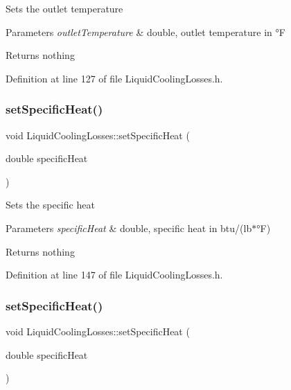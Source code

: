 Sets the outlet temperature


\begin{DoxyParams}{Parameters}
{\em outlet\+Temperature} & double, outlet temperature in °F\\
\hline
\end{DoxyParams}
\begin{DoxyReturn}{Returns}
nothing 
\end{DoxyReturn}


Definition at line 127 of file Liquid\+Cooling\+Losses.\+h.

\mbox{\label{class_liquid_cooling_losses_a38ff1ff4dc0de69c72db094bf2259993}} 
\subsubsection{\texorpdfstring{set\+Specific\+Heat()}{setSpecificHeat()}\hspace{0.1cm}{\footnotesize\ttfamily [1/3]}}
{\footnotesize\ttfamily void Liquid\+Cooling\+Losses\+::set\+Specific\+Heat (\begin{DoxyParamCaption}\item[{double}]{specific\+Heat }\end{DoxyParamCaption})\hspace{0.3cm}{\ttfamily [inline]}}

Sets the specific heat


\begin{DoxyParams}{Parameters}
{\em specific\+Heat} & double, specific heat in btu/(lb$\ast$°F)\\
\hline
\end{DoxyParams}
\begin{DoxyReturn}{Returns}
nothing 
\end{DoxyReturn}


Definition at line 147 of file Liquid\+Cooling\+Losses.\+h.

\mbox{\label{class_liquid_cooling_losses_a38ff1ff4dc0de69c72db094bf2259993}} 
\subsubsection{\texorpdfstring{set\+Specific\+Heat()}{setSpecificHeat()}\hspace{0.1cm}{\footnotesize\ttfamily [2/3]}}
{\footnotesize\ttfamily void Liquid\+Cooling\+Losses\+::set\+Specific\+Heat (\begin{DoxyParamCaption}\item[{double}]{specific\+Heat }\end{DoxyParamCaption})\hspace{0.3cm}{\ttfamily [inline]}}

